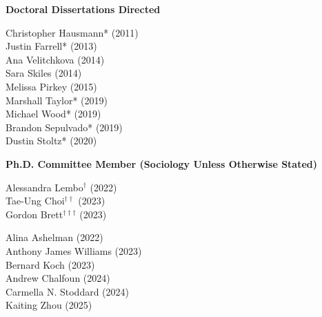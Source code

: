 
\noindent \textbf{Doctoral Dissertations Directed }

\begin{multicols}{2}
    \noindent
    Christopher Hausmann\textcolor{uclablue}{*} (2011) \\
    Justin Farrell\textcolor{uclablue}{*} (2013) \\
    Ana Velitchkova (2014) \\
    Sara Skiles (2014) \\
    Melissa Pirkey (2015) \\
    Marshall Taylor\textcolor{uclablue}{*} (2019) \\
    Michael Wood\textcolor{uclablue}{*} (2019) \\
    Brandon Sepulvado\textcolor{uclablue}{*} (2019) \\
    Dustin Stoltz\textcolor{uclablue}{*} (2020) 
\end{multicols}
\medskip

\medskip
\noindent \textbf{Ph.D. Committee Member (Sociology Unless Otherwise Stated)} 

\begin{multicols}{2} \noindent
    Alessandra Lembo\textcolor{uclablue}{$^{\dag}$} (2022) \\
    Tae-Ung Choi\textcolor{uclablue}{$^{\dag \dag}$} (2023) \\
    Gordon Brett\textcolor{uclablue}{$^{\dag \dag \dag}$} (2023) \\
\end{multicols}

\begin{multicols}{2} \noindent
    Alina Ashelman (2022) \\
    Anthony James Williams (2023) \\
    Bernard Koch (2023) \\
    Andrew Chalfoun (2024) \\
    Carmella N. Stoddard (2024) \\
    Kaiting Zhou (2025)
\end{multicols}

